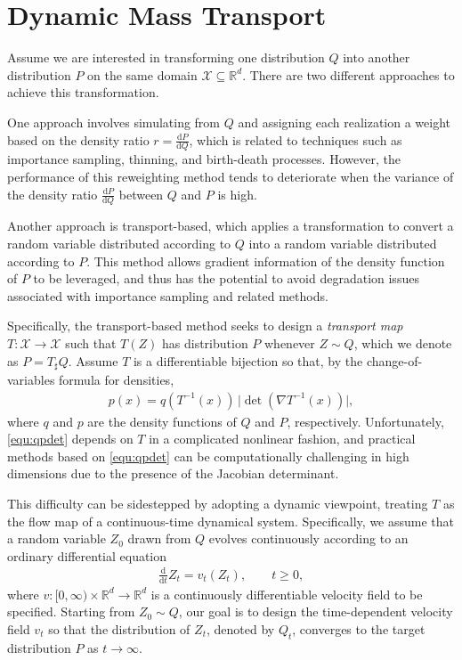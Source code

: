 \documentclass[12pt,paper=letter]{scrreprt}
\newcommand{\RR}{\mathbb{R}}
\newcommand{\dd}{\mathrm{d}}
\newcommand{\df}{\mathrm{d}}
\begin{document}
\section{Dynamic Mass Transport}

Assume we are interested in transforming one distribution $Q$ into another distribution $P$ on the same domain $\mathcal{X} \subseteq \mathbb{R}^d$.
There are two different approaches to achieve this transformation.

One approach involves simulating from $Q$ and assigning each realization a weight based on the density ratio
$r = \frac{\dd P}{\dd Q}$,
which is related to techniques such as importance sampling, thinning, and birth-death processes.
However, the performance of this reweighting method tends to deteriorate when the variance of the density ratio
$\frac{\dd P}{\dd Q}$ between $Q$ and $P$ is high.

Another approach is transport-based, which applies a transformation to convert a random variable distributed according to $Q$ into a random variable distributed according to $P$.
This method allows gradient information of the density function of $P$ to be leveraged, and thus has the potential to avoid degradation issues associated with importance sampling and related methods.

Specifically, the transport-based method seeks to design a \emph{transport map}
$T\colon \mathcal{X}\to \mathcal{X}$
such that $T(Z)$ has distribution $P$ whenever $Z\sim Q$, which we denote as $P = T_\sharp Q$.
Assume $T$ is a differentiable bijection so that, by the change-of-variables formula for densities,
\begin{align}\label{equ:qpdet}
p(x) = q(T^{-1}(x))\,\bigl|\det(\nabla T^{-1}(x))\bigr|,
\end{align}
where $q$ and $p$ are the density functions of $Q$ and $P$, respectively.
Unfortunately, \eqref{equ:qpdet} depends on $T$ in a complicated nonlinear fashion, and practical methods based on \eqref{equ:qpdet} can be computationally challenging in high dimensions due to the presence of the Jacobian determinant.

This difficulty can be sidestepped by adopting a dynamic viewpoint, treating $T$ as the flow map of a continuous-time dynamical system.
Specifically, we assume that a random variable $Z_0$ drawn from $Q$ evolves continuously according to an  ordinary differential equation
\begin{align}\label{equ:odedt}
\frac{\df}{\df t} Z_t = v_t(Z_t), \qquad t \ge 0,
\end{align}
where $v \colon [0,\infty)\times \RR^d \to \RR^d$ is a continuously differentiable velocity field to be specified.
Starting from $Z_0 \sim Q$, our goal is to design the time-dependent velocity field $v_t$ so that the distribution of $Z_t$, denoted by $Q_t$, converges to the target distribution $P$ as $t \to \infty$.
\end{document}
